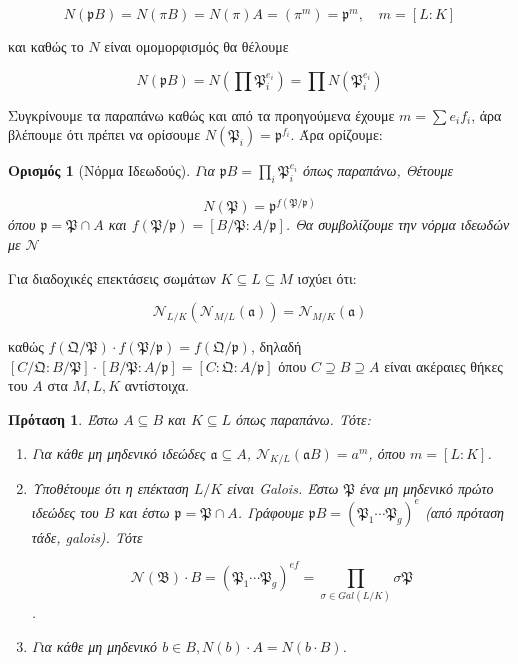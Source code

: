 \documentclass[oneside,a4paper]{article}
\newtheorem*{defn}{Ορισμός}
\newtheorem{prop}{Πρόταση}
\newcommand {\tl}{\textlatin}
\begin{document}
$$N(\mathfrak{p}B) = N(\pi B) = N(\pi) A = (\pi^m) = \mathfrak{p}^m, \quad m = [L:K]$$

και καθώς το $N$ είναι ομομορφισμός θα θέλουμε 

$$N(\mathfrak{p} B) = N(\prod \mathfrak{P}^{e_i}_i) = \prod N(\mathfrak{P}^{e_i}_i)$$


Συγκρίνουμε τα παραπάνω καθώς και από τα προηγούμενα έχουμε $m = \sum e_i f_i$, άρα βλέπουμε ότι πρέπει να ορίσουμε $N(\mathfrak{P}_i) = \mathfrak{p}^{f_i}$. Άρα ορίζουμε:


\begin{defn}[Νόρμα Ιδεωδούς]
	Για $\mathfrak{p} B = \prod_i \mathfrak{P}^{e_i}_i$ όπως παραπάνω, Θέτουμε

	$$N(\mathfrak{P}) = \mathfrak{p}^{f(\mathfrak{P}/\mathfrak{p})}$$ όπου $\mathfrak{p} = \mathfrak{P} \cap A$ και $f(\mathfrak{P}/\mathfrak{p}) = [B/\mathfrak{P}: A/\mathfrak{p}]$. 
	Θα συμβολίζουμε την νόρμα ιδεωδών με $\mathcal{N}$
\end{defn}

Για διαδοχικές επεκτάσεις σωμάτων $K \subseteq L \subseteq M$ ισχύει ότι:

$$\mathcal{N}_{L/K}(\mathcal{N}_{M/L}(\mathfrak{a})) = \mathcal{N}_{M/K}(\mathfrak{a})$$

καθώς $f(\mathfrak{Q}/\mathfrak{P})\cdot f(\mathfrak{P}/\mathfrak{p}) = f(\mathfrak{Q}/\mathfrak{p})$, δηλαδή $[C/\mathfrak{Q}:B/\mathfrak{P}]\cdot [B/\mathfrak{P}: A/\mathfrak{p}] = [C:\mathfrak{Q}: A/\mathfrak{p}]$ όπου $C \supseteq B \supseteq A$ είναι ακέραιες θήκες του $A$ στα $M,L,K$ αντίστοιχα.




\begin{prop}
	Έστω $A \subseteq B$ και $K\subseteq L$ όπως παραπάνω. Τότε:
	\begin{enumerate}
		\item Για κάθε μη μηδενικό ιδεώδες $\mathfrak{a} \subseteq A$, $\mathcal{N}_{K/L} (\mathfrak{a}B) = a^m$, όπου $m = [L:K]$.
		\item Υποθέτουμε ότι η επέκταση $L/K$ είναι \tl{Galois}. Έστω $\mathfrak{P}$ ένα μη μηδενικό πρώτο ιδεώδες του $B$ και έστω $\mathfrak{p} = \mathfrak{P}\cap A$. Γράφουμε $\mathfrak{p}B = (\mathfrak{P}_1 \cdots \mathfrak{P}_g)^e$ (από πρόταση τάδε, \tl{galois}). Τότε
		
		$$\mathcal{N}(\mathfrak{B}) \cdot B = (\mathfrak{P}_1 \cdots \mathfrak{P}_g)^{ef} = \prod\limits_{\sigma \in Gal(L/K)} \sigma \mathfrak{P}$$.

		\item Για κάθε μη μηδενικό $b \in B, N(b) \cdot A = N(b\cdot B)$.
	\end{enumerate}
\end{prop}
\end{document}
